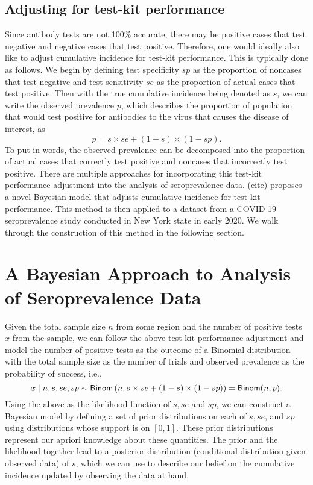 \subsection{Adjusting for test-kit performance}
Since antibody tests are not 100\% accurate, there may be positive cases that test negative and negative cases that test positive. Therefore, one would ideally also like to adjust cumulative incidence for test-kit performance. This is typically done as follows. We begin by defining test specificity $sp$ as the proportion of noncases that test negative and test sensitivity $se$ as the proportion of actual cases that test positive. Then with the true cumulative incidence being denoted as $s$, we can write the observed prevalence $p$, which describes the proportion of population that would test positive for antibodies to the virus that causes the disease of interest, as
\[
p = s \times se + (1-s) \times (1 - sp).
\]
To put in words, the observed prevalence can be decomposed into the proportion of actual cases that correctly test positive and noncases that incorrectly test positive. There are multiple approaches for incorporating this test-kit performance adjustment into the analysis of seroprevalence data. (cite) proposes a novel Bayesian model that adjusts cumulative incidence for test-kit performance. This method is then applied to a dataset from a COVID-19 seroprevalence study conducted in New York state in early 2020. We walk through the construction of this method in the following section.
\section{A Bayesian Approach to Analysis of Seroprevalence Data}
Given the total sample size $n$ from some region and the number of positive tests $x$ from the sample, we can follow the above test-kit performance adjustment and model the number of positive tests as the outcome of a Binomial distribution with the total sample size as the number of trials and observed prevalence as the probability of success, i.e.,
\[
x \mid n, s, se, sp \sim {\sf{Binom}}\left(n, s \times se + (1-s) \times (1 - sp)\right) = {\sf{Binom}}(n, p).
\]
Using the above as the likelihood function of $s, se$ and $sp$, we can construct a Bayesian model by defining a set of prior distributions on each of $s, se$, and $sp$ using distributions whose support is on $[0,1]$. These prior distributions represent our apriori knowledge about these quantities. The prior and the likelihood together lead to a posterior distribution (conditional distribution given observed data) of $s$, which we can use to describe our belief on the cumulative incidence updated by observing the data at hand. 
